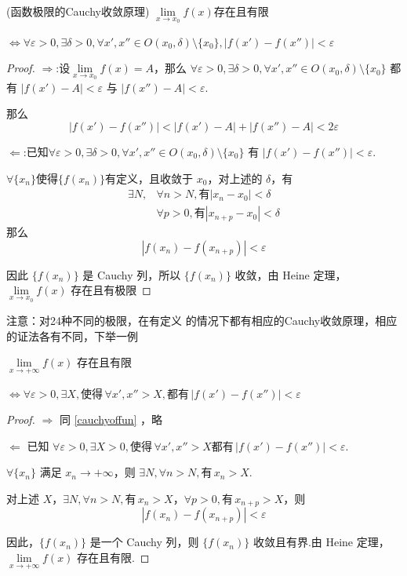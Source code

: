 \begin{proposition}
	(函数极限的Cauchy收敛原理)
	$\lim\limits_{x\to x_0}f(x)$存在且有限
	
	$\Leftrightarrow\forall \varepsilon > 0, \exists \delta > 0, \forall x', x'' \in O(x_0, \delta)\setminus\{x_0\}, |f(x') - f(x'')| < \varepsilon$
	\label{cauchyoffun}
\end{proposition}

\begin{proof}
	$\Rightarrow$:设$\lim\limits_{x \to x_0} f(x) = A$，那么 $\forall \varepsilon > 0, \exists \delta > 0, \forall x', x'' \in O(x_0, \delta) \setminus \{x_0\}$ 都有 $|f(x') - A| < \varepsilon$ 与 $|f(x'') - A| < \varepsilon$.
	
	那么
	\[
	|f(x') - f(x'')| < |f(x') - A| + |f(x'') - A| < 2\varepsilon
	\]
	
	$\Leftarrow$:已知$\forall \varepsilon > 0, \exists \delta > 0, \forall x',x'' \in O(x_0, \delta) \setminus\{x_0\}$ 有 $|f(x') - f(x'')| < \varepsilon$.
	
	$\forall \{x_n\}$使得$\{f(x_n)\}$有定义，且收敛于 $x_0$，对上述的 $\delta$，有
	$$\begin{aligned}
		\exists N, &\forall n > N,\textbf{有} |x_n - x_0| < \delta\\
		&\forall p > 0,\textbf{有} |x_{n+p} - x_0| < \delta
	\end{aligned}$$
	那么
	\[
	|f(x_n) - f(x_{n+p})| < \varepsilon
	\]
	
	因此 $\{f(x_n)\}$ 是 Cauchy 列，所以 $\{f(x_n)\}$ 收敛，由 Heine 定理，$\lim\limits_{x \to x_0} f(x)$ 存在且有极限
	
\end{proof}
注意：对24种不同的极限，在有定义 的情况下都有相应的Cauchy收敛原理，相应的证法各有不同，下举一例

\begin{example}
	$\lim\limits_{x \to +\infty} f(x)$ 存在且有限
	
	$\Leftrightarrow \forall \varepsilon > 0, \exists X, \text{使得} \, \forall x', x'' > X, \text{都有} \, |f(x') - f(x'')| < \varepsilon$
\end{example}
\begin{proof}
	$\Rightarrow$ 同 \ref{cauchyoffun} ，略
	
	$\Leftarrow$ 已知 $\forall \varepsilon > 0, \exists X > 0, \text{使得} \, \forall x', x'' > X  \text{都有} \, |f(x') - f(x'')| < \varepsilon$.
	
	$\forall \{x_n\}$ 满足 $x_n \to +\infty$，则 $\exists N, \forall n > N, \text{有} \, x_n > X$.
	
	对上述 $X$，$\exists N, \forall n > N, \text{有} \, x_n > X$，$\forall p > 0, \text{有} \, x_{n+p} > X$，则
	\[
	|f(x_n) - f(x_{n+p})| < \varepsilon
	\]
	
	因此，$\{f(x_n)\}$ 是一个 Cauchy 列，则 $\{f(x_n)\}$ 收敛且有界.由 Heine 定理，$\lim\limits_{x \to +\infty} f(x)$ 存在且有限.
\end{proof}

